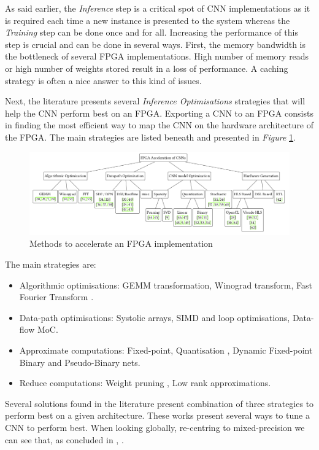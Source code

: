 As said earlier, the \emph{Inference} step is a critical spot of CNN implementations as it is required each time a new instance is presented to the system whereas the \emph{Training} step can be done once and for all. Increasing the performance of this step is crucial and can be done in several ways. First, the memory bandwidth is the bottleneck of several FPGA implementations. High number of memory reads or high number of weights stored result in a loss of performance. A caching strategy is often a nice answer to this kind of issues.

Next, the literature presents several \emph{Inference Optimisations} strategies that will help the CNN perform best on an FPGA. Exporting a CNN to an FPGA consists in finding the most efficient way to map the CNN on the hardware architecture of the FPGA. The main strategies are listed beneath and presented in \emph{Figure} \ref{fig:InferenceOpt}.

\begin{figure}[htbp]
	\centering
		\includegraphics[width=\textwidth]{Figures/InferenceOpt.png}
	\caption[Inference Optimisations]{Methods to accelerate an FPGA implementation \cite{Abdelouahab2018}}
	\label{fig:InferenceOpt}
\end{figure}

The main strategies are:
\begin{itemize}
	\item Algorithmic optimisations: GEMM transformation, Winograd transform, Fast Fourier Transform .
	\item Data-path optimisations: Systolic arrays, SIMD and loop optimisations, Data-flow MoC.
	\item Approximate computations: Fixed-point, Quantisation \cite{Hubara2016}, Dynamic Fixed-point Binary \cite{Courbariaux2016} and Pseudo-Binary nets.
	\item Reduce computations: Weight pruning \cite{Radu2020}, Low rank approximations.
\end{itemize}

Several solutions found in the literature present combination of three strategies to perform best on a given architecture. These works present several ways to tune a CNN to perform best. When looking globally, re-centring to mixed-precision we can see that, as concluded in \cite{Abdelouahab2018}, .

